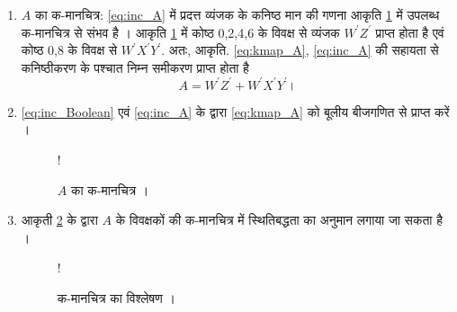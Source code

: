 \renewcommand{\theequation}{\theenumi}
\renewcommand{\thefigure}{\theenumi}
\begin{enumerate}[label=\thesubsection.\arabic*.,ref=\thesubsection.\theenumi]

\item $A$ का क-मानचित्र: 
\eqref{eq:inc_A}  में प्रदत्त व्यंजक के कनिष्ठ मान  की गणना आकृति \ref{fig:kmap_A} में  उपलब्ध क-मानचित्र  से संभव है ।
आकृति \ref{fig:kmap_A}  में कोष्ठ 0,2,4,6 के विवक्ष से व्यंजक $W^{\prime}Z^{\prime}$ प्राप्त होता है एवं  कोष्ठ 0,8 के विवक्ष से $W^{\prime}X^{\prime}Y^{\prime}$.  अतः, आकृति. \ref{eq:kmap_A},  \eqref{eq:inc_A} की सहायता से कनिष्ठीकरण के पश्चात निम्न समीकरण प्राप्त होता है
%
\begin{equation}
\label{eq:kmap_A}
A = W^{\prime}Z^{\prime}+W^{\prime}X^{\prime}Y^{\prime} ।
\end{equation}
%
\item  \ref{eq:inc_Boolean}  एवं \eqref{eq:inc_A} के द्वारा
%
\eqref{eq:kmap_A} को  बूलीय बीजगणित से  प्राप्त करें ।
%
%
%
\begin{figure}[!h]
\resizebox {\columnwidth} {!} {

}
\caption{$A$ का क-मानचित्र ।}
\label{fig:kmap_A}
\end{figure}
\item आकृती \ref{fig:kmap} के द्वारा  $A$ के विवक्षकों की क-मानचित्र में स्थितिबद्धता का अनुमान लगाया जा सकता है ।
%
\begin{figure}[!h]
\resizebox {\columnwidth} {!} {

}
\caption{क-मानचित्र का विश्लेषण ।}
\label{fig:kmap}
\end{figure}


\end{enumerate}
